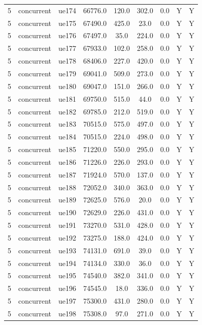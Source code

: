 \begin{table}[ht]
\begin{tabular}{|c|c|c|c|c|c|c|c|c|}
5 & concurrent & ue174 & 66776.0 & 120.0 & 302.0 & 0.0 & Y & Y \\
5 & concurrent & ue175 & 67490.0 & 425.0 & 23.0 & 0.0 & Y & Y \\
5 & concurrent & ue176 & 67497.0 & 35.0 & 224.0 & 0.0 & Y & Y \\
5 & concurrent & ue177 & 67933.0 & 102.0 & 258.0 & 0.0 & Y & Y \\
5 & concurrent & ue178 & 68406.0 & 227.0 & 420.0 & 0.0 & Y & Y \\
5 & concurrent & ue179 & 69041.0 & 509.0 & 273.0 & 0.0 & Y & Y \\
5 & concurrent & ue180 & 69047.0 & 151.0 & 266.0 & 0.0 & Y & Y \\
5 & concurrent & ue181 & 69750.0 & 515.0 & 44.0 & 0.0 & Y & Y \\
5 & concurrent & ue182 & 69785.0 & 212.0 & 519.0 & 0.0 & Y & Y \\
5 & concurrent & ue183 & 70515.0 & 575.0 & 497.0 & 0.0 & Y & Y \\
5 & concurrent & ue184 & 70515.0 & 224.0 & 498.0 & 0.0 & Y & Y \\
5 & concurrent & ue185 & 71220.0 & 550.0 & 295.0 & 0.0 & Y & Y \\
5 & concurrent & ue186 & 71226.0 & 226.0 & 293.0 & 0.0 & Y & Y \\
5 & concurrent & ue187 & 71924.0 & 570.0 & 137.0 & 0.0 & Y & Y \\
5 & concurrent & ue188 & 72052.0 & 340.0 & 363.0 & 0.0 & Y & Y \\
5 & concurrent & ue189 & 72625.0 & 576.0 & 20.0 & 0.0 & Y & Y \\
5 & concurrent & ue190 & 72629.0 & 226.0 & 431.0 & 0.0 & Y & Y \\
5 & concurrent & ue191 & 73270.0 & 531.0 & 428.0 & 0.0 & Y & Y \\
5 & concurrent & ue192 & 73275.0 & 188.0 & 424.0 & 0.0 & Y & Y \\
5 & concurrent & ue193 & 74131.0 & 691.0 & 39.0 & 0.0 & Y & Y \\
5 & concurrent & ue194 & 74134.0 & 330.0 & 36.0 & 0.0 & Y & Y \\
5 & concurrent & ue195 & 74540.0 & 382.0 & 341.0 & 0.0 & Y & Y \\
5 & concurrent & ue196 & 74545.0 & 18.0 & 336.0 & 0.0 & Y & Y \\
5 & concurrent & ue197 & 75300.0 & 431.0 & 280.0 & 0.0 & Y & Y \\
5 & concurrent & ue198 & 75308.0 & 97.0 & 271.0 & 0.0 & Y & Y \\

\end{tabular}
\end{table}
